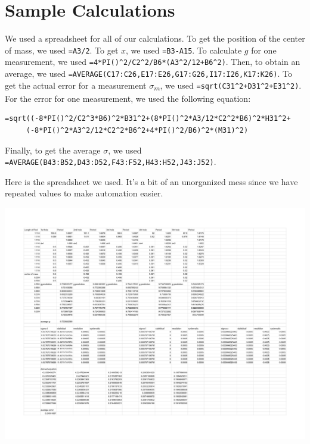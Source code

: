 \documentclass[12pt]{article}
\begin{document}
\section{Sample Calculations}
\label{sec:org5796f9a}

We used a spreadsheet for all of our calculations. To get the position of the center of mass, we used \texttt{=A3/2}. To get \(x\), we used \texttt{=B3-A15}. To calculate \(g\) for one measurement, we used \texttt{=4*PI()\textasciicircum{}2/C2\textasciicircum{}2/B6*(A3\textasciicircum{}2/12+B6\textasciicircum{}2)}. Then, to obtain an average, we used \texttt{=AVERAGE(C17:C26,E17:E26,G17:G26,I17:I26,K17:K26)}. To get the actual error for a measurement \(\sigma\)\textsubscript{\(m\)}, we used \texttt{=sqrt(C31\textasciicircum{}2+D31\textasciicircum{}2+E31\textasciicircum{}2)}. For the error for one measurement, we used the following equation:

\begin{verbatim}
=sqrt((-8*PI()^2/C2^3*B6)^2*B31^2+(8*PI()^2*A3/12*C2^2*B6)^2*H31^2+
     (-8*PI()^2*A3^2/12*C2^2*B6^2+4*PI()^2/B6)^2*(M31)^2)
\end{verbatim}

Finally, to get the average \(\sigma\), we used \texttt{=AVERAGE(B43:B52,D43:D52,F43:F52,H43:H52,J43:J52)}.

Here is the spreadsheet we used. It's a bit of an unorganized mess since we have repeated values to make automation easier.

\begin{center}
\includegraphics[width=7in]{./spreadsheet.pdf}
\end{center}
\end{document}
